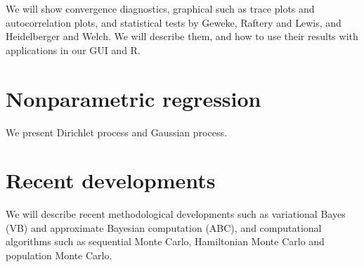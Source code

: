 \documentclass[
]{book}
\begin{document}
We will show convergence diagnostics, graphical such as trace plots and autocorrelation plots, and statistical tests by Geweke, Raftery and Lewis, and Heidelberger and Welch. We will describe them, and how to use their results with applications in our GUI and R.

\hypertarget{nonpara}{%
\chapter{Nonparametric regression}\label{nonpara}}

We present Dirichlet process and Gaussian process.

\hypertarget{recent}{%
\chapter{Recent developments}\label{recent}}

We will describe recent methodological developments such as variational Bayes (VB) and approximate Bayesian computation (ABC), and computational algorithms such as sequential Monte Carlo, Hamiltonian Monte Carlo and population Monte Carlo.

  
\end{document}

